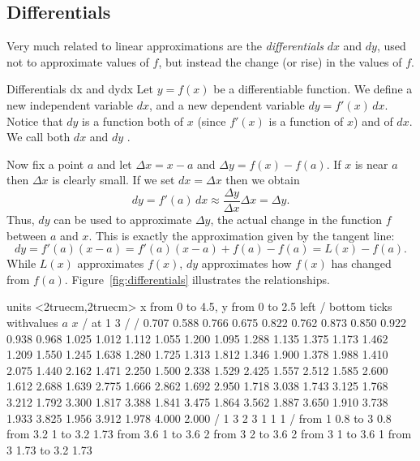 \subsection{Differentials}\label{sec:differentials}
Very much related to linear approximations are the {\em differentials} $dx$ and $dy$, used not to approximate values of $f$, but instead the change (or rise) in the values of $f$.

\begin{definition}{Differentials dx and dy}{dx}
Let $y=f(x)$ be a differentiable function. We define a new
  independent variable $dx$, and a new dependent variable
  $dy=f'(x)\,dx$. Notice that $dy$ is a function both of $x$ (since
  $f'(x)$ is a function of $x$) and of $dx$.  We call both $dx$ and
  $dy$ .  
\end{definition}

Now fix a point $a$ and let $\Delta x =x-a$ and $\Delta y= f(x)-f(a)$.
If $x$ is near $a$ then $\Delta x$ is clearly small. If we set $dx=\Delta x$ then we obtain
\[ dy = f'(a)\,dx \approx \frac{\Delta y}{\Delta x}\Delta x = \Delta y.\]
Thus, $dy$ can be used to approximate $\Delta y$, the actual change in
the function $f$ between $a$ and $x$. This is exactly the
approximation given by the tangent line:
\[ dy = f'(a)(x-a) = f'(a)(x-a)+f(a)-f(a)=L(x)-f(a).\]
While $L(x)$ approximates $f(x)$, $dy$ approximates how $f(x)$ has
changed from $f(a)$.
Figure~\ref{fig:differentials} illustrates the relationships.

\figure[!ht]
\centerline{\vbox{\beginpicture
\normalgraphs
\setcoordinatesystem units <2truecm,2truecm>
\setplotarea x from 0 to 4.5, y from 0 to 2.5
\axis left /
\axis bottom ticks withvalues {$a$} {$x$} / at 1 3 / /
 0.707 0.588 0.766 0.675 0.822 0.762 0.873 0.850 0.922 
0.938 0.968 1.025 1.012 1.112 1.055 1.200 1.095 1.288 1.135 
1.375 1.173 1.462 1.209 1.550 1.245 1.638 1.280 1.725 1.313 
1.812 1.346 1.900 1.378 1.988 1.410 2.075 1.440 2.162 1.471 
2.250 1.500 2.338 1.529 2.425 1.557 2.512 1.585 2.600 1.612 
2.688 1.639 2.775 1.666 2.862 1.692 2.950 1.718 3.038 1.743 
3.125 1.768 3.212 1.792 3.300 1.817 3.388 1.841 3.475 1.864 
3.562 1.887 3.650 1.910 3.738 1.933 3.825 1.956 3.912 1.978 
4.000 2.000 /
\setlinear
{} 1 3 2 3 1 1 1 /
 from 1 0.8 to 3 0.8
 from 3.2 1 to 3.2 1.73
 from 3.6 1 to 3.6 2
\setdashes <2pt>
\putrule from 3 2 to 3.6 2
\putrule from 3 1 to 3.6 1
\putrule from 3 1.73 to 3.2 1.73
\endpicture}}
\caption{Differentials.\label{fig:differentials}}
\endfigure

